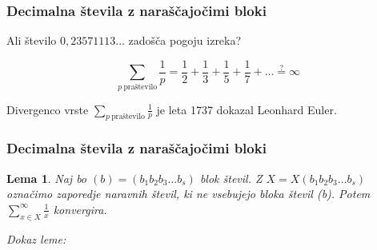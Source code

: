 \documentclass{beamer}
\newtheorem{lema}{Lema}
\begin{document}
\begin{frame}\frametitle{Decimalna števila z naraščajočimi bloki}

    Ali število $0,23571113\ldots$ zadošča pogoju izreka?
    \pause
    
    \[
        \sum_{p \ \text{praštevilo}}\frac{1}{p} =
        \frac{1}{2} + \frac{1}{3} + \frac{1}{5} + \frac{1}{7} + \ldots \overset{?}{=} \infty \]
    \pause

    Divergenco vrste $\sum_{p \ \text{praštevilo}}\frac{1}{p}$ je leta 1737 dokazal Leonhard Euler.

\end{frame}

\begin{frame}\frametitle{Decimalna števila z naraščajočimi bloki}

    \begin{lema}
        Naj bo $(b) = (b_1b_2b_3 \dots b_s)$ blok števil. Z $X = X(b_1b_2b_3 \dots b_s)$ označimo
        zaporedje naravnih števil, ki ne vsebujejo bloka števil (b). Potem 
        $\sum_{x \in X}^{\infty} \frac{1}{x}$ konvergira.
    \end{lema}
    \emph{Dokaz leme:}
    \newline
    \newline
    \newline
    \newline
    \newline
    \newline
    \newline
    \newline
    \newline
    \newline
    \newline
    \newline
    \newline
\end{frame}

\begin{frame}
\end{frame}
\end{document}
